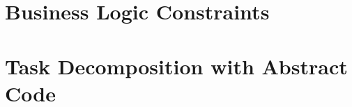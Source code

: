 \documentclass{article}
\begin{document}
\newpage
\section{Business Logic Constraints}

\newpage
\section{Task Decomposition with Abstract Code}
\end{document}

